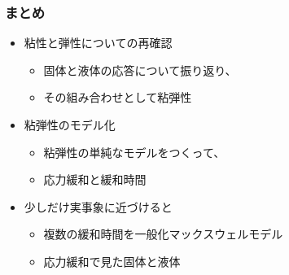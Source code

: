 \documentclass[12pt, dvipdfmx]{beamer}
\newcommand{\backupbegin}{
   \newcounter{framenumberappendix}
   \setcounter{framenumberappendix}{\value{framenumber}}
}
\newcommand{\backupend}{
   \addtocounter{framenumberappendix}{-\value{framenumber}}
   \addtocounter{framenumber}{\value{framenumberappendix}} 
}
\begin{document}
\begin{frame}
	\frametitle{まとめ}
        \begin{boxnote}
            \vspace{-3mm}
            \begin{itemize}
                \item 粘性と弾性についての再確認
                    \begin{itemize}
                        \item 固体と液体の応答について振り返り、
                        \item その組み合わせとして粘弾性
                    \end{itemize} 
                \item 粘弾性のモデル化
                    \begin{itemize}
                        \item 粘弾性の単純なモデルをつくって、
                        \item 応力緩和と緩和時間
                    \end{itemize} 
                \item 少しだけ実事象に近づけると
                    \begin{itemize}
                        \item 複数の緩和時間を一般化マックスウェルモデル
                        \item 応力緩和で見た固体と液体
                    \end{itemize}
            \end{itemize}
        \end{boxnote}
\end{frame}



\end{document}
